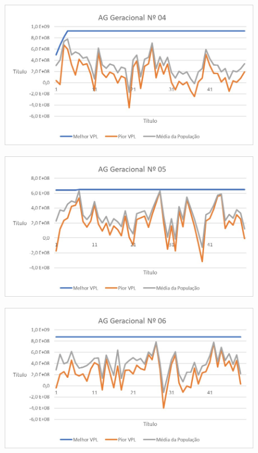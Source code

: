 \documentclass[12pt,a4paper]{report}
\begin{document}
\begin{figure}[H]
\centering

\includegraphics[scale=1]{AGG/4}

\end{figure}

\begin{figure}[H]
\centering

\includegraphics[scale=1]{AGG/5}

\end{figure}

\begin{figure}[H]
\centering

\includegraphics[scale=1]{AGG/6}

\end{figure}
\end{document}
